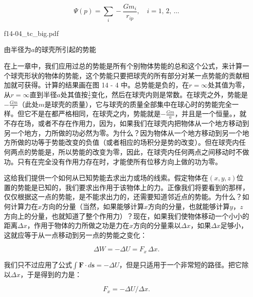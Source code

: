 \documentclass[12pt,oneside]{book}
\providecommand{\FLPvec}[1]{\boldsymbol{#1}}
\providecommand{\FLPF}[0]{\FLPvec{F}}
\providecommand{\FLPs}[0]{\FLPvec{s}}
\begin{document}
\begin{equation}
\label{Eq:I:14:8}
\Psi(p)=\sum_i-\frac{Gm_i}{r_{ip}},\quad
i=\text{$1$, $2$, $\ldots$}
\end{equation}

\begin{fig}{f14-04_tc_big.pdf}
\caption{由半径为$a$的球壳所引起的势能}
\label{fig:14-4}
\end{fig}

在上一章中，我们应用过总的势能是所有个别物体势能的总和这个公式，来计算一个球壳形状的物体的势能，这个势能只要把球壳的所有部分对某一点势能的贡献相加就可获得。计算的结果画在图 14 - 4 中。总势能是负的，在$r = \infty$处其值为零，从$r = \infty$直到半径$a$处其值按$\frac{1}{r}$变化，然后在球壳内则是常数。在球壳之外，势能是$-\frac{Gm}{r}$（此处$m$是球壳的质量），它与球壳的质量全部集中在球心时的势能完全一样。但它不是在都严格相同，在球壳之内，势能就是$-\frac{Gm}{a}$，并且是一个恒量。，就不存在场，或者不存在作用力，因为，如果我们在球壳内把物体从一个地方移动到另一个地方，力所做的功必然为零。为什么？因为物体从一个地方移动到另一个地方所做的功等于势能改变的负值（或者相应的场积分是势的改变）。但在球壳内任何两点的势能是，所以势能的改变为零，因此，在球壳内任何两点之间移动时不做功。只有在完全没有作用力存在时，才能使所有位移方向上做的功为零。


这给我们提供一个如何从已知势能去求出力或场的线索。假定物体在$(x,y,z)$位置的势能是已知的，我们要求出作用于该物体上的力。正像我们将要看到的那样，仅仅根据这一点的势能，是不能求出力的，还需要知道邻近点的势能。为什么？如何计算力在$x$方向的分量（当然，如果能够计算$x$方向的分量，也就能够计算$y$，$z$方向上的分量，也就知道了整个作用力）？现在，如果我们使物体移动一个小小的距离$\Delta x$，作用于物体的力所做之功是力在$x$方向的分量乘以$\Delta x$，如果$\Delta x$足够小，这就应等于从一点移动到另一点的势能之变化：


\begin{equation}
\label{Eq:I:14:9}
\Delta W=-\Delta U=F_x\,\Delta x.
\end{equation}

我们只不过应用了公式$\int\FLPF\cdot d\FLPs=-\Delta U$，但是只适用于一个非常短的路径。把它除以$\Delta x$，于是得到的力是：


\begin{equation}
\label{Eq:I:14:10}
F_x=-\Delta U/\Delta x.
\end{equation}
\end{document}
